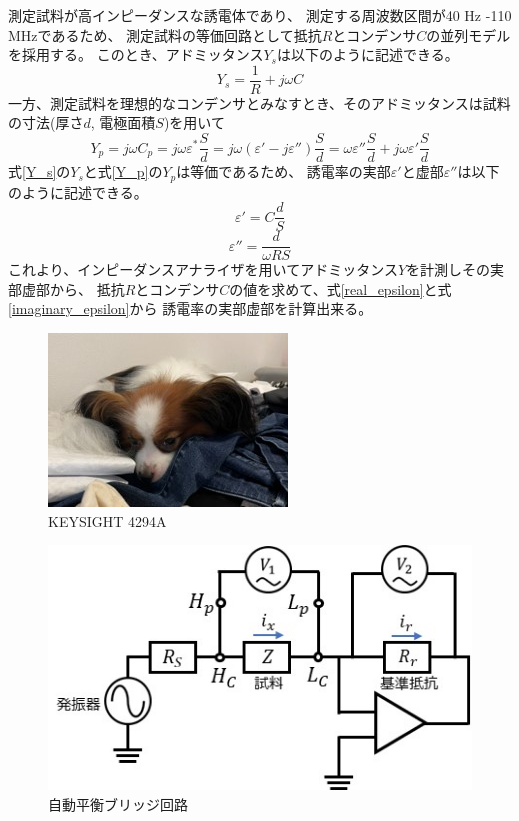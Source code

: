 \documentclass[dvipdfmx,12pt,a4paper]{jreport}
\begin{document}
			測定試料が高インピーダンスな誘電体であり、
			測定する周波数区間が40 Hz -110 MHzであるため、
			測定試料の等価回路として抵抗$R$とコンデンサ$C$の並列モデルを採用する。
			このとき、アドミッタンス$Y_s$は以下のように記述できる。
			\begin{equation}
				Y_s = \frac{1}{R}+j\omega C
				\label{Y_s}
			\end{equation}
			一方、測定試料を理想的なコンデンサとみなすとき、そのアドミッタンスは試料の寸法(厚さ$d$, 電極面積$S$)を用いて
			\begin{equation}
				Y_p= j \omega C_p = j \omega \varepsilon^{*} \frac{S}{d} = 
				j\omega (\varepsilon'-j\varepsilon'')\frac{S}{d} =
				\omega\varepsilon''\frac{S}{d} + j\omega \varepsilon' \frac{S}{d}
				\label{Y_p}
			\end{equation}
			式\ref{Y_s}の$Y_s$と式\ref{Y_p}の$Y_p$は等価であるため、
			誘電率の実部$\varepsilon'$と虚部$\varepsilon''$は以下のように記述できる。
			\begin{equation}
				\varepsilon' = C \frac{d}{S}
				\label{real_epsilon}
			\end{equation}
			\begin{equation}
				\varepsilon'' = \frac{d}{\omega R S}
				\label{imaginary_epsilon}
			\end{equation}
			これより、インピーダンスアナライザを用いてアドミッタンス$Y$を計測しその実部虚部から、
			抵抗$R$とコンデンサ$C$の値を求めて、式\ref{real_epsilon}と式\ref{imaginary_epsilon}から
			誘電率の実部虚部を計算出来る。
			\begin{figure}[h]
				\centering
				\includegraphics{sora.jpg}
				\caption{KEYSIGHT 4294A}
				\label{インピーダンスアナライザ}
			\end{figure}
			\begin{figure}[h]
				\centering
				\includegraphics{自動平衡ブリッジ回路.jpg}
				\caption{自動平衡ブリッジ回路}
				\label{自動平衡ブリッジ回路}
			\end{figure}
\end{document}
